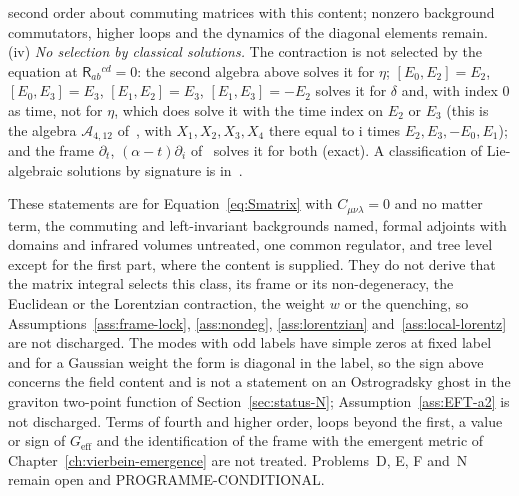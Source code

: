 second order about commuting matrices with this content; nonzero background commutators, higher loops and the dynamics of the diagonal elements remain. (iv) \emph{No selection by classical solutions.} The contraction is not selected by the equation at \(\mathsf R_{ab}{}^{cd}=0\): the second algebra above solves it for \(\eta\); \([E_0,E_2]=E_2\), \([E_0,E_3]=E_3\), \([E_1,E_2]=E_3\), \([E_1,E_3]=-E_2\) solves it for \(\delta\) and, with index \(0\) as time, not for \(\eta\), which does solve it with the time index on \(E_2\) or \(E_3\) (this is the algebra \(\mathcal A_{4,12}\) of~\cite{Chatzistavrakidis2011}, with \(X_1,X_2,X_3,X_4\) there equal to \(\mathrm i\) times \(E_2,E_3,-E_0,E_1\)); and the frame \(\partial_t\), \((\alpha-t)\partial_i\) of~\cite{IsonoTomino2010} solves it for both (exact). A classification of Lie-algebraic solutions by signature is in~\cite{Liao2026}.

These statements are for Equation~\eqref{eq:Smatrix} with \(C_{\mu\nu\lambda}=0\) and no matter term, the commuting and left-invariant backgrounds named, formal adjoints with domains and infrared volumes untreated, one common regulator, and tree level except for the first part, where the content is supplied. They do not derive that the matrix integral selects this class, its frame or its non-degeneracy, the Euclidean or the Lorentzian contraction, the weight \(w\) or the quenching, so Assumptions~\ref{ass:frame-lock}, \ref{ass:nondeg}, \ref{ass:lorentzian} and~\ref{ass:local-lorentz} are not discharged. The modes with odd labels have simple zeros at fixed label and for a Gaussian weight the form is diagonal in the label, so the sign above concerns the field content and is not a statement on an Ostrogradsky ghost in the graviton two-point function of Section~\ref{sec:status-N}; Assumption~\ref{ass:EFT-a2} is not discharged. Terms of fourth and higher order, loops beyond the first, a value or sign of \(G_{\mathrm{eff}}\) and the identification of the frame with the emergent metric of Chapter~\ref{ch:vierbein-emergence} are not treated. Problems~D, E, F and~N remain open and PROGRAMME-CONDITIONAL.

